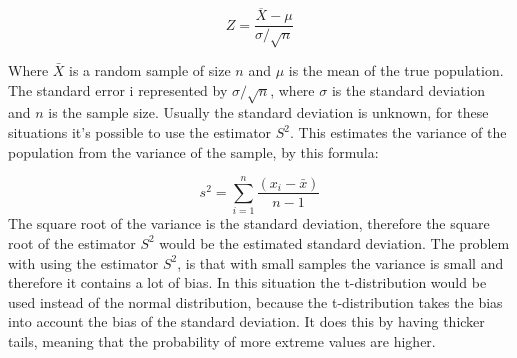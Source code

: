 \begin{equation}
Z=\frac{\overline{X}-\mu}{\sigma/\sqrt{n}}
\end{equation}


\noindent Where $\bar{X}$ is a random sample of size $n$ and $\mu$ is the mean of the true population. The standard error i represented by $\sigma/\sqrt{n}$, where $\sigma$ is the standard deviation and $n$ is the sample size.
Usually the standard deviation is unknown, for these situations it's possible to use the estimator $S^2$. This estimates the variance of the population from the variance of the sample, by this formula:

\begin{equation}
s^2=\sum_{i=1}^{n}\frac{(x_{i}-\bar{x})}{n-1}
\end{equation}
The square root of the variance is the standard deviation, therefore the square root of the estimator $S^2$ would be the estimated standard deviation. The problem with using the estimator $S^2$, is that with small samples the variance is small and therefore it contains a lot of bias. In this situation the t-distribution would be used instead of the normal distribution, because the t-distribution takes the bias into account the bias of the standard deviation. It does this by having thicker tails, meaning that the probability of more extreme values are higher.

